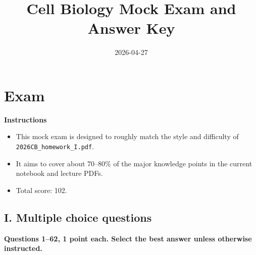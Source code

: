 \documentclass[12pt,fontset=none]{ctexart}
\title{Cell Biology Mock Exam and Answer Key}
\author{}
\date{2026-04-27}
\begin{document}
\maketitle

\section*{Exam}
\textbf{Instructions}
\begin{itemize}
\item This mock exam is designed to roughly match the style and difficulty of \texttt{2026CB\_homework\_I.pdf}.
\item It aims to cover about 70--80\% of the major knowledge points in the current notebook and lecture PDFs.
\item Total score: 102.
\end{itemize}

\subsection*{I. Multiple choice questions}
\textbf{Questions 1--62, 1 point each. Select the best answer unless otherwise instructed.}
\end{document}
